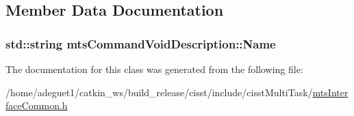 \subsection{Member Data Documentation}
\hypertarget{classmts_command_void_description_a03b004586fef73637e80f22f3dbbf8f6}{
\subsubsection[{Name}]{\setlength{\rightskip}{0pt plus 5cm}std\-::string mts\-Command\-Void\-Description\-::\-Name}}\label{classmts_command_void_description_a03b004586fef73637e80f22f3dbbf8f6}


The documentation for this class was generated from the following file\-:\begin{DoxyCompactItemize}
\item 
/home/adeguet1/catkin\-\_\-ws/build\-\_\-release/cisst/include/cisst\-Multi\-Task/\hyperlink{mts_interface_common_8h}{mts\-Interface\-Common.\-h}\end{DoxyCompactItemize}
